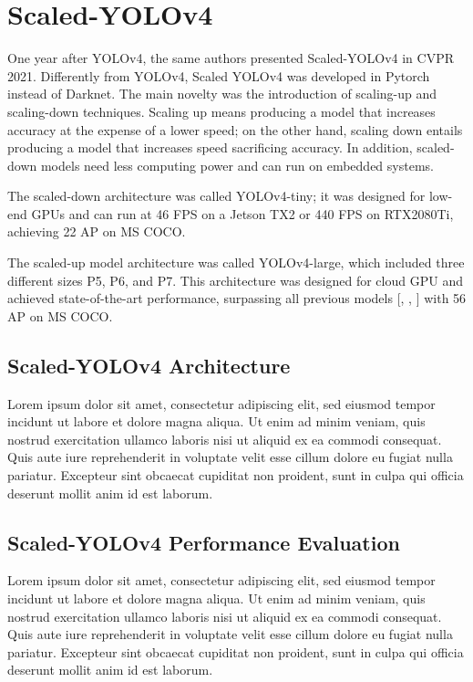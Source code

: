 \documentclass{article}
\begin{document}
\section{Scaled-YOLOv4}


One year after YOLOv4, the same authors presented Scaled-YOLOv4 \cite{wang2021scaled} in CVPR 2021. Differently from YOLOv4, Scaled YOLOv4 was developed in Pytorch instead of Darknet. The main novelty was the introduction of scaling-up and scaling-down techniques. Scaling up means producing a model that increases accuracy at the expense of a lower speed; on the other hand, scaling down entails producing a model that increases speed sacrificing accuracy. In addition, scaled-down models need less computing power and can run on embedded systems.

The scaled-down architecture was called YOLOv4-tiny; it was designed for low-end GPUs and can run at 46 FPS on a Jetson TX2 or 440 FPS on RTX2080Ti, achieving 22 AP on MS COCO.

The scaled-up model architecture was called YOLOv4-large, which included three different sizes P5, P6, and P7. This architecture was designed for cloud GPU and achieved state-of-the-art performance, surpassing all previous models [\cite{9156454}, \cite{8417976}, \cite{long2020pp}] with 56 AP on MS COCO.

\subsection{Scaled-YOLOv4 Architecture}


Lorem ipsum dolor sit amet, consectetur adipiscing elit, sed eiusmod tempor incidunt ut labore et dolore magna aliqua. Ut enim ad minim veniam, quis nostrud exercitation ullamco laboris nisi ut aliquid ex ea commodi consequat. Quis aute iure reprehenderit in voluptate velit esse cillum dolore eu fugiat nulla pariatur. Excepteur sint obcaecat cupiditat non proident, sunt in culpa qui officia deserunt mollit anim id est laborum.

\subsection{Scaled-YOLOv4 Performance Evaluation}


Lorem ipsum dolor sit amet, consectetur adipiscing elit, sed eiusmod tempor incidunt ut labore et dolore magna aliqua. Ut enim ad minim veniam, quis nostrud exercitation ullamco laboris nisi ut aliquid ex ea commodi consequat. Quis aute iure reprehenderit in voluptate velit esse cillum dolore eu fugiat nulla pariatur. Excepteur sint obcaecat cupiditat non proident, sunt in culpa qui officia deserunt mollit anim id est laborum.
\end{document}
